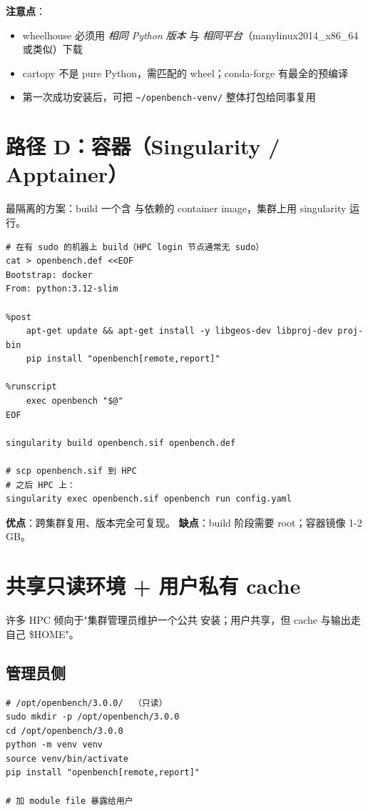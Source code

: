 \textbf{注意点}：

\begin{itemize}
  \item wheelhouse 必须用 \emph{相同 Python 版本} 与 \emph{相同平台}（manylinux2014\_x86\_64 或类似）下载
  \item cartopy 不是 pure Python，需匹配的 wheel；conda-forge 有最全的预编译
  \item 第一次成功安装后，可把 \texttt{\~{}/openbench-venv/} 整体打包给同事复用
\end{itemize}

\section{路径 D：容器（Singularity / Apptainer）}

最隔离的方案：build 一个含 \openbench{} 与依赖的 container image，集群上用 singularity 运行。

\begin{verbatim}
# 在有 sudo 的机器上 build（HPC login 节点通常无 sudo）
cat > openbench.def <<EOF
Bootstrap: docker
From: python:3.12-slim

%post
    apt-get update && apt-get install -y libgeos-dev libproj-dev proj-bin
    pip install "openbench[remote,report]"

%runscript
    exec openbench "$@"
EOF

singularity build openbench.sif openbench.def

# scp openbench.sif 到 HPC
# 之后 HPC 上：
singularity exec openbench.sif openbench run config.yaml
\end{verbatim}

\textbf{优点}：跨集群复用、版本完全可复现。
\textbf{缺点}：build 阶段需要 root；容器镜像 1-2 GB。

\section{共享只读环境 + 用户私有 cache}

许多 HPC 倾向于"集群管理员维护一个公共 \openbench{} 安装；用户共享，但 cache 与输出走自己 \$HOME"。

\subsection{管理员侧}

\begin{verbatim}
# /opt/openbench/3.0.0/  （只读）
sudo mkdir -p /opt/openbench/3.0.0
cd /opt/openbench/3.0.0
python -m venv venv
source venv/bin/activate
pip install "openbench[remote,report]"

# 加 module file 暴露给用户
\end{verbatim}

